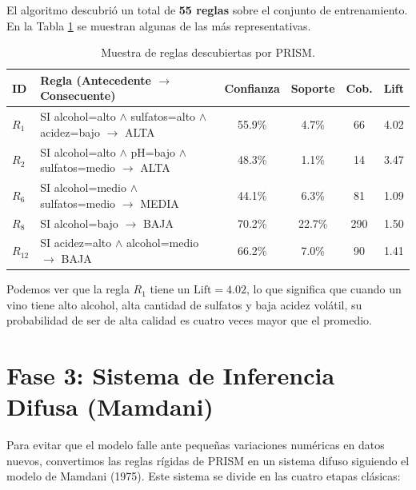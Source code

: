 \documentclass[11pt,a4paper]{article}
\begin{document}
El algoritmo descubrió un total de \textbf{55 reglas} sobre el conjunto de entrenamiento. En la Tabla \ref{tab:reglas_ejemplo} se muestran algunas de las más representativas.

\begin{table}[H]
\centering
\caption{Muestra de reglas descubiertas por PRISM.}
\label{tab:reglas_ejemplo}
\small
\begin{tabular}{llcccc}
\toprule
\textbf{ID} & \textbf{Regla (Antecedente $\to$ Consecuente)} & \textbf{Confianza} & \textbf{Soporte} & \textbf{Cob.} & \textbf{Lift} \\
\midrule
$R_1$ & SI alcohol=alto $\land$ sulfatos=alto $\land$ acidez=bajo $\to$ ALTA & 55.9\% & 4.7\% & 66 & 4.02 \\
$R_2$ & SI alcohol=alto $\land$ pH=bajo $\land$ sulfatos=medio $\to$ ALTA & 48.3\% & 1.1\% & 14 & 3.47 \\
$R_6$ & SI alcohol=medio $\land$ sulfatos=medio $\to$ MEDIA & 44.1\% & 6.3\% & 81 & 1.09 \\
$R_8$ & SI alcohol=bajo $\to$ BAJA & 70.2\% & 22.7\% & 290 & 1.50 \\
$R_{12}$ & SI acidez=alto $\land$ alcohol=medio $\to$ BAJA & 66.2\% & 7.0\% & 90 & 1.41 \\
\bottomrule
\end{tabular}
\end{table}

Podemos ver que la regla $R_1$ tiene un $\text{Lift} = 4.02$, lo que significa que cuando un vino tiene alto alcohol, alta cantidad de sulfatos y baja acidez volátil, su probabilidad de ser de alta calidad es cuatro veces mayor que el promedio.

\section{Fase 3: Sistema de Inferencia Difusa (Mamdani)}

Para evitar que el modelo falle ante pequeñas variaciones numéricas en datos nuevos, convertimos las reglas rígidas de PRISM en un sistema difuso siguiendo el modelo de Mamdani (1975). Este sistema se divide en las cuatro etapas clásicas:
\end{document}

